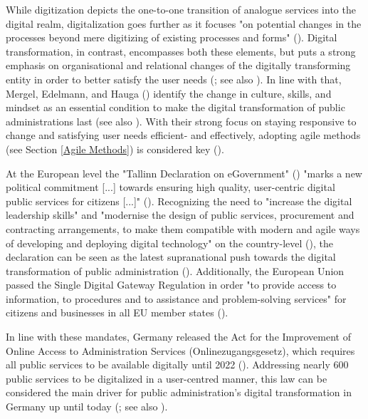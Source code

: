 While digitization depicts the one-to-one transition of analogue services into the digital realm, digitalization goes further as it focuses "on potential changes in the processes beyond mere digitizing of existing processes and forms" (\cite[p. 12]{Mergel2019a}). Digital transformation, in contrast, encompasses both these elements, but puts a strong emphasis on organisational and relational changes of the digitally transforming entity in order to better satisfy the user needs (\cite{Mergel2019a}; see also \cite{Vial2019, Henriette2015}). In line with that, Mergel, Edelmann, and Hauga (\cite*{Mergel2019a}) identify the change in culture, skills, and mindset as an essential condition to make the digital transformation of public administrations last (see also \cite{Dierks2020, Parcell2013}). With their strong focus on staying responsive to change and satisfying user needs efficient- and effectively, adopting agile methods (see Section \ref{Agile Methods}) is considered key (\cite{Mergel2018,Beyer2010, Mergel2019, osmundsen2020, Andriole2018}).\par 
At the European level the "Tallinn Declaration on eGovernment" (\cite*{EuropeanCommission2017}) "marks a new political commitment [...] towards ensuring high quality, user-centric digital public services for citizens [...]" (\cite{EuropeanCommission2017a}). Recognizing the need to "increase the digital leadership skills" and "modernise the design of public services, procurement and contracting arrangements, to make them compatible with modern and agile ways of developing and deploying digital technology" on the country-level (\cite[p. 7]{EuropeanCommission2017}), the declaration can be seen as the latest supranational push towards the digital transformation of public administration (\cite{Mergel2019a}). Additionally, the European Union passed the Single Digital Gateway Regulation in order "to provide access to information, to procedures and to assistance and problem-solving services" for citizens and businesses in all EU member states (\cite{EuropeanUnion2018}).\par 
In line with these mandates, Germany released the Act for the Improvement of Online Access to Administration Services (Onlinezugangsgesetz), which requires all public services to be available digitally until 2022 (\cite{DeutscherBundestag2017}). Addressing nearly 600 public services to be digitalized in a user-centred manner, this law can be considered the main driver for public administration's digital transformation in Germany up until today (\cite{Mergel2019, BundesministeriumdesInnerenfurBauundHeimat2017}; see also \cite{EuropeanCommission2019a}).\par 
